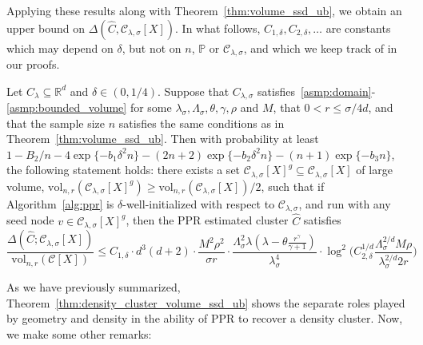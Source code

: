 \documentclass[11pt,twoside]{article}
\newcommand{\Reals}{\mathbb{R}}
\newcommand{\1}{\mathbf{1}}
\newcommand{\Rd}{\Reals^d}
\newcommand{\mc}[1]{\mathcal{#1}}
\newcommand{\Pbb}{\mathbb{P}}
\newcommand{\wh}[1]{\widehat{#1}}
\newcommand{\vol}{\mathrm{vol}}
\begin{document}
\noindent Applying these results along with Theorem~\ref{thm:volume_ssd_ub}, we obtain an upper bound on $\Delta(\wh{C},\mc{C}_{\lambda,\sigma}[X])$. In what follows, $C_{1,\delta},C_{2,\delta},\ldots$ are constants which may depend on $\delta$, but not on $n$, $\Pbb$ or $\mc{C}_{\lambda,\sigma}$, and which we keep track of in our proofs.
\begin{theorem}
	\label{thm:density_cluster_volume_ssd_ub}
	Let $C_{\lambda} \subseteq \Rd$ and $\delta \in (0,1/4)$. Suppose that $C_{\lambda,\sigma}$ satisfies~\ref{asmp:domain}-\ref{asmp:bounded_volume} for some $\lambda_{\sigma}, \Lambda_{\sigma}, \theta, \gamma, \rho$ and $M$, that $0 < r \leq \sigma/4d$, and that the sample size $n$ satisfies the same conditions as in Theorem~\ref{thm:volume_ssd_ub}. Then with probability at least $1 - B_2/n - 4\exp\{-b_1\delta^2n\} - (2n + 2)\exp\{-b_2\delta^2n\} - (n + 1)\exp\{-b_3n\}$, the following statement holds: there exists a set $\mc{C}_{\lambda,\sigma}[X]^g \subseteq \mc{C}_{\lambda,\sigma}[X]$ of large volume, $\vol_{n,r}(\mc{C}_{\lambda,\sigma}[X]^g) \geq \vol_{n,r}(\mc{C}_{\lambda,\sigma}[X])/2$, such that if Algorithm~\ref{alg:ppr} is $\delta$-well-initialized with respect to $\mc{C}_{\lambda,\sigma}$, and run with any seed node $v \in \mc{C}_{\lambda,\sigma}[X]^g$, then the PPR estimated cluster $\wh{C}$ satisfies
	\begin{equation}
	\label{eqn:density_cluster_volume_ssd_ub}
	\frac{\Delta(\wh{C};\mc{C}_{\lambda,\sigma}[X])}{\vol_{n,r}(\mc{C}[X])} \leq C_{1,\delta} \cdot d^3(d + 2) \cdot \frac{M^2\rho^2}{\sigma r} \cdot \frac{\Lambda_{\sigma}^2 \lambda (\lambda - \theta \frac{r^{\gamma}}{\gamma + 1})}{\lambda_{\sigma}^4} \cdot \log^2\biggl(C_{2,\delta}^{1/d} \frac{\Lambda_{\sigma}^{2/d} M\rho}{\lambda_{\sigma}^{2/d}2r}\biggr)
	\end{equation}
\end{theorem}
As we have previously summarized, Theorem~\ref{thm:density_cluster_volume_ssd_ub} shows the separate roles played by geometry and density in the ability of PPR to recover a density cluster. Now, we make some other remarks:
\end{document}
